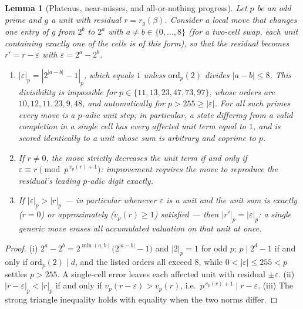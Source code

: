\documentclass[11pt]{article}
\newtheorem{lemma}{Lemma}
\begin{document}
\begin{lemma}[Plateaus, near-misses, and all-or-nothing progress]
\label{lem:pow2-landscape}
Let $p$ be an odd prime and $g$ a unit with residual $r = r_g(\beta)$.
Consider a local move that changes one entry of $g$ from $2^b$ to $2^a$
with $a \ne b \in \{0,\dots,8\}$ (for a two-cell swap, each unit containing
exactly one of the cells is of this form), so that the residual becomes
$r' = r - \varepsilon$ with $\varepsilon = 2^{a} - 2^{b}$.
\begin{enumerate}
\item[(i)] $|\varepsilon|_p = |2^{|a-b|}-1|_p$, which equals $1$ unless
$\mathrm{ord}_p(2)$ divides $|a-b| \le 8$. This divisibility is impossible
for $p \in \{11, 13, 23, 47, 73, 97\}$, whose orders are
$10, 12, 11, 23, 9, 48$, and automatically for $p > 255 \ge |\varepsilon|$.
For all such primes every move is a $p$-adic unit step; in particular, a
state differing from a valid completion in a single cell has every affected
unit term equal to $1$, and is scored identically to a unit whose sum is
arbitrary and coprime to $p$.
\item[(ii)] If $r \ne 0$, the move strictly decreases the unit term if and
only if $\varepsilon \equiv r \pmod{p^{\,v_p(r)+1}}$: improvement requires
the move to reproduce the residual's leading $p$-adic digit exactly.
\item[(iii)] If $|\varepsilon|_p > |r|_p$ --- in particular whenever
$\varepsilon$ is a unit and the unit sum is exactly ($r=0$) or approximately
($v_p(r) \ge 1$) satisfied --- then $|r'|_p = |\varepsilon|_p$: a single
generic move erases all accumulated valuation on that unit at once.
\end{enumerate}
\end{lemma}

\begin{proof}
(i) $2^{a}-2^{b} = 2^{\min(a,b)}\bigl(2^{|a-b|}-1\bigr)$ and $|2|_p = 1$
for odd $p$; $p \mid 2^{d}-1$ if and only if $\mathrm{ord}_p(2) \mid d$,
and the listed orders all exceed $8$, while $0 < |\varepsilon| \le 255 < p$
settles $p > 255$. A single-cell error leaves each affected unit with
residual $\pm\varepsilon$. (ii) $|r-\varepsilon|_p < |r|_p$ if and only if
$v_p(r-\varepsilon) > v_p(r)$, i.e.\ $p^{\,v_p(r)+1} \mid r - \varepsilon$.
(iii) The strong triangle inequality holds with equality when the two norms
differ.
\end{proof}
\end{document}
